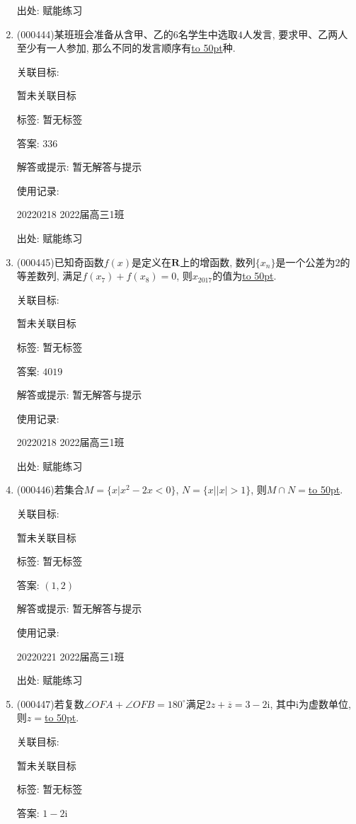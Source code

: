 \documentclass[10pt,a4paper]{article}
\newcommand{\blank}[1]{\underline{\hbox to #1pt{}}}
\begin{document}
\begin{enumerate}[1.]
出处: 赋能练习
\item { (000444)}某班班会准备从含甲、乙的$6$名学生中选取$4$人发言, 要求甲、乙两人至少有一人参加, 那么不同的发言顺序有\blank{50}种.


关联目标:

暂未关联目标



标签: 暂无标签

答案: $336$

解答或提示: 暂无解答与提示

使用记录:

20220218	2022届高三1班	


出处: 赋能练习
\item { (000445)}已知奇函数$f(x)$是定义在$\mathbf{R}$上的增函数, 数列$\{x_n\}$是一个公差为$2$的等差数列, 满足$f(x_7)+f(x_8)=0$, 则$x_{2017}$的值为\blank{50}.


关联目标:

暂未关联目标



标签: 暂无标签

答案: $4019$

解答或提示: 暂无解答与提示

使用记录:

20220218	2022届高三1班	


出处: 赋能练习
\item { (000446)}若集合$M=\{x|{x^2}-2x<0\}$, $N=\{x||x|>1\}$, 则$M\cap N=$\blank{50}.


关联目标:

暂未关联目标



标签: 暂无标签

答案: $(1,2)$

解答或提示: 暂无解答与提示

使用记录:

20220221	2022届高三1班	


出处: 赋能练习
\item { (000447)}若复数$\angle OFA+\angle OFB={180^\circ}$满足$2z+\overline z=3-2\mathrm{i}$, 其中$\mathrm{i}$为虚数单位, 则$z=$\blank{50}.


关联目标:

暂未关联目标



标签: 暂无标签

答案: $1-2\mathrm{i}$


\end{enumerate}
\end{document}
